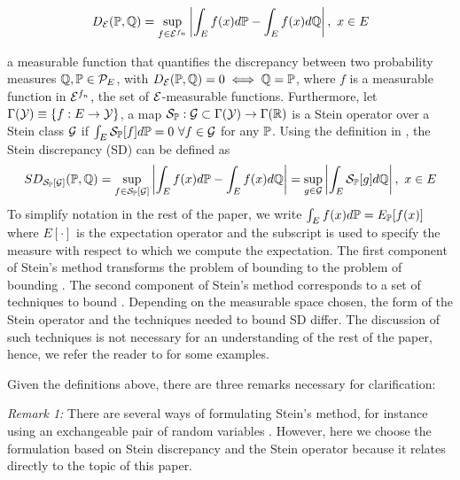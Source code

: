 \begin{equation}\label{IPM}
D_{\mathcal{E}}(\mathbb{P}, \mathbb{Q}) = \sup_{f \in \mathcal{E}^{f_n}}\left|\int_E f(x)d\mathbb{P} - \int_E f(x)d\mathbb{Q}\right|, \ x \in E
\end{equation}

a measurable function that quantifies the discrepancy between two probability measures $\mathbb{Q},\mathbb{P} \in \mathcal{P}_{E}$, with $D_{\mathcal{E}}(\mathbb{P}, \mathbb{Q}) = 0 \iff \mathbb{Q}= \mathbb{P}$, where $f$ is a measurable function in $\mathcal{E}^{f_n}$, the set of $\mathcal{E}$-measurable functions. Furthermore, let $\Gamma(\mathcal{Y}) \equiv \{f: E \rightarrow \mathcal{Y} \}$, a map $\mathcal{S}_{\mathbb{P}}: \mathcal{G} \subset \Gamma(\mathcal{Y}) \rightarrow \Gamma(\mathbb{R})$ is a Stein operator over a Stein class $\mathcal{G}$ if $\int_E \mathcal{S}_{\mathbb{P}}[f]d\mathbb{P} = 0 \ \forall f \in \mathcal{G}$ for any $\mathbb{P}$. Using the definition in , the Stein discrepancy (SD) can be defined as 
\begin{equation}\label{stein_discrepancy}
SD_{\mathcal{S}_{\mathbb{P}}[\mathcal{G}]}(\mathbb{P},\mathbb{Q}) = \sup_{f \in \mathcal{S}_{\mathbb{P}}[\mathcal{G}]} \left|\int_E f(x)d\mathbb{P} - \int_E f(x)d\mathbb{Q} \right| = \sup_{g \in \mathcal{G}}\left|\int_E \mathcal{S}_{\mathbb{P}}[g]d\mathbb{Q} \right|, \ x \in E
\end{equation}
To simplify notation in the rest of the paper, we write $\int_E f(x)d\mathbb{P} = E_{\mathbb{P}}[f(x)]$ where $E[\cdot]$ is the expectation operator and the subscript is used to specify the measure with respect to which we compute the expectation. 
The first component of Stein's method transforms the problem of bounding  to the problem of bounding . The second component of Stein's method corresponds to a set of techniques to bound . Depending on the measurable space chosen, the form of the Stein operator and the techniques needed to bound SD differ. The discussion of such techniques is not necessary for an understanding of the rest of the paper, hence, we refer the reader to \cite{ross2011fundamentals} for some examples. 

Given the definitions above, there are three remarks necessary for clarification:

\emph{Remark 1:} There are several ways of formulating Stein's method, for instance using an exchangeable pair of random variables \cite{stein1986approximate}. However, here we choose the formulation based on Stein discrepancy and the Stein operator because it relates directly to the topic of this paper.

